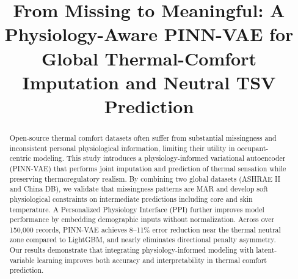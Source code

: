 \documentclass[preprint,12pt,authoryear]{elsarticle}
\begin{document}
\begin{frontmatter}



\title{From Missing to Meaningful: A Physiology-Aware PINN-VAE for Global Thermal-Comfort Imputation and Neutral TSV Prediction} %


\author{} %


\begin{abstract}
Open-source thermal comfort datasets often suffer from substantial missingness and inconsistent personal physiological information, limiting their utility in occupant-centric modeling. This study introduces a physiology-informed variational autoencoder (PINN-VAE) that performs joint imputation and prediction of thermal sensation while preserving thermoregulatory realism. By combining two global datasets (ASHRAE II and China DB), we validate that missingness patterns are MAR and develop soft physiological constraints on intermediate predictions including core and skin temperature. A Personalized Physiology Interface (PPI) further improves model performance by embedding demographic inputs without normalization. Across over 150,000 records, PINN-VAE achieves 8–11\% error reduction near the thermal neutral zone compared to LightGBM, and nearly eliminates directional penalty asymmetry. Our results demonstrate that integrating physiology-informed modeling with latent-variable learning improves both accuracy and interpretability in thermal comfort prediction.
\end{abstract}



\end{frontmatter}
\end{document}

